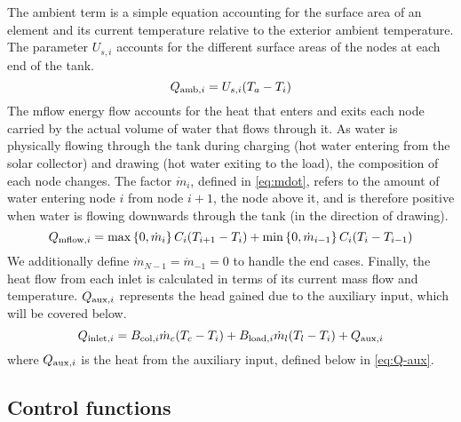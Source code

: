 The ambient term is a simple equation accounting for the surface area of an element and its current temperature relative to the exterior ambient temperature.
The parameter $U_{s, i}$ accounts for the different surface areas of the nodes at each end of the tank.
\begin{equation}
   \label{eq:Q-amb}
   Q_{\text{amb}, i} = U_{s, i} (T_a - T_i)
\end{equation}
The mflow energy flow accounts for the heat that enters and exits each node carried by the actual volume of water that flows through it.
As water is physically flowing through the tank during charging (hot water entering from the solar collector) and drawing (hot water exiting to the load), the composition of each node changes.
The factor $\dot{m}_i$, defined in \autoref{eq:mdot}, refers to the amount of water entering node $i$ from node $i+1$, the node above it, and is therefore positive when water is flowing downwards through the tank (in the direction of drawing).
\begin{equation}
   \label{eq:Q-mflow}
   Q_{\text{mflow}, i} = \max \left\{ 0, \dot{m}_i \right\}     C_i (T_{i+1} - T_i)
             + \min \left\{ 0, \dot{m}_{i-1} \right\} C_i (T_i - T_{i-1})
\end{equation}
We additionally define $\dot{m}_{N-1} = \dot{m}_{-1} = 0$ to handle the end cases.
Finally, the heat flow from each inlet is calculated in terms of its current mass flow and temperature.
$Q_{\text{aux}, i}$ represents the head gained due to the auxiliary input, which will be covered below.
\begin{equation}
   \label{eq:Q-inlet}
   Q_{\text{inlet}, i} = B_{\text{col}, i} \dot{m}_c (T_c - T_i)
             + B_{\text{load}, i} \dot{m}_l (T_l - T_i)
             + Q_{\text{aux}, i}
\end{equation}
where $Q_{\text{aux}, i}$ is the heat from the auxiliary input, defined below in \autoref{eq:Q-aux}.

\subsection{Control functions}

